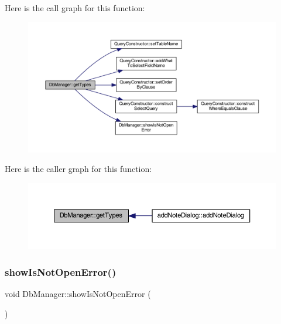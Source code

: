 Here is the call graph for this function\+:
\nopagebreak
\begin{figure}[H]
\begin{center}
\leavevmode
\includegraphics[width=350pt]{classDbManager_ade7585873652935bb12cb1ad546ceba2_cgraph}
\end{center}
\end{figure}
Here is the caller graph for this function\+:
\nopagebreak
\begin{figure}[H]
\begin{center}
\leavevmode
\includegraphics[width=350pt]{classDbManager_ade7585873652935bb12cb1ad546ceba2_icgraph}
\end{center}
\end{figure}
\hypertarget{classDbManager_a2d60ab2a556cf0276bf306c7545ed03d}{}\label{classDbManager_a2d60ab2a556cf0276bf306c7545ed03d} 
\subsubsection{\texorpdfstring{show\+Is\+Not\+Open\+Error()}{showIsNotOpenError()}}
{\footnotesize\ttfamily void Db\+Manager\+::show\+Is\+Not\+Open\+Error (\begin{DoxyParamCaption}{ }\end{DoxyParamCaption})\hspace{0.3cm}{\ttfamily [static]}}



